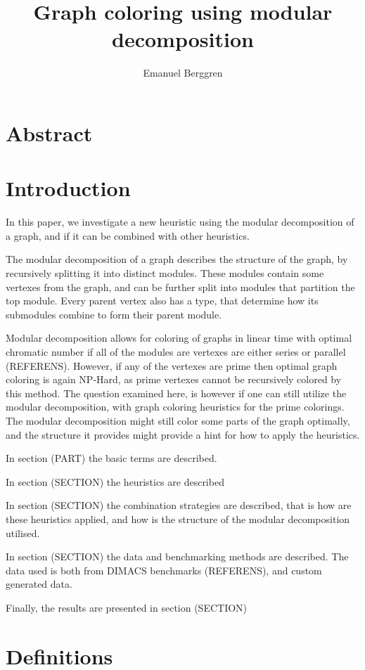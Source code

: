 \documentclass{amsart}
\author{Emanuel Berggren}
\title{Graph coloring using modular decomposition}
\theoremstyle{definition}
\begin{document}
\maketitle

\section{Abstract}

\section{Introduction}

In this paper, we investigate a new heuristic using the modular decomposition of
a graph, and if it can be combined with other heuristics. 

The modular decomposition of a graph describes the structure of the graph, by
recursively splitting it into distinct modules. These modules contain some
vertexes from the graph, and can be further split into modules that partition
the top module. Every parent vertex also has a type, that determine how its submodules
combine to form their parent module.

Modular decomposition allows for coloring of graphs in linear time with optimal
chromatic number if all of the modules are vertexes are either  series or
parallel (REFERENS). However, if any of the vertexes are prime then optimal graph coloring 
is again NP-Hard, as prime vertexes cannot be recursively colored by this
method. The question examined here, is however if one can still utilize the
modular decomposition, with graph coloring heuristics for the prime colorings.
The modular decomposition might still color some parts of the graph optimally,
and the structure it provides might provide a hint for how to apply the
heuristics.

In section (PART) the basic terms are described.

In section (SECTION) the heuristics are described

In section (SECTION) the combination strategies are described, that is how are
these heuristics applied, and how is the structure of the modular decomposition
utilised.

In section (SECTION) the data and benchmarking methods are described. The data
used is both from DIMACS benchmarks (REFERENS), and custom generated data.

Finally, the results are presented in section (SECTION)

\section{Definitions}
\end{document}
